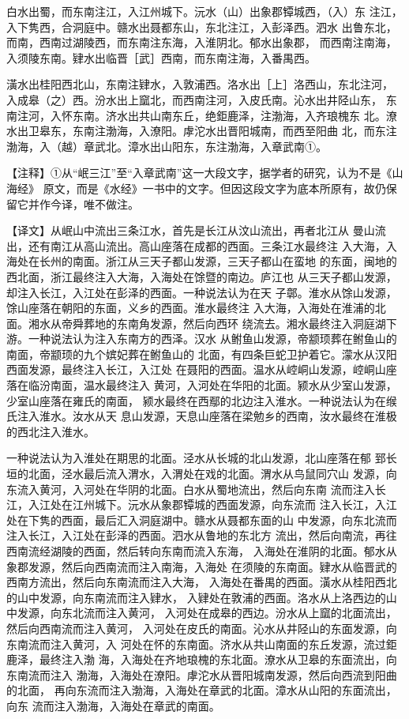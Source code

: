 \documentclass[a4paper,12pt,UTF8,twoside]{ctexbook}
\begin{document}
白水出蜀，而东南注江，入江州城下。沅水（山）出象郡镡城西，（入）东 注江，入下隽西，合洞庭中。赣水出聂都东山，东北注江，入彭泽西。泗水 出鲁东北，而南，西南过湖陵西，而东南注东海，入淮阴北。郁水出象郡， 而西南注南海，入须陵东南。肄水出临晋［武］西南，而东南注海，入番禺西。

潢水出桂阳西北山，东南注肄水，入敦浦西。洛水出［上］洛西山，东北注河， 入成皋（之）西。汾水出上窳北，而西南注河，入皮氏南。沁水出井陉山东， 东南注河，入怀东南。济水出共山南东丘，绝鉅鹿泽，注渤海，入齐琅槐东 北。潦水出卫皋东，东南注渤海，入潦阳。虖沱水出晋阳城南，而西至阳曲 北，而东注渤海，入（越）章武北。漳水出山阳东，东注渤海，入章武南①。

【注释】①从“岷三江”至“入章武南”这一大段文字，据学者的研究，认为不是《山海经》 原文，而是《水经》一书中的文字。但因这段文字为底本所原有，故仍保留它并作今译，唯不做注。

【译文】从岷山中流出三条江水，首先是长江从汶山流出，再者北江从 曼山流出，还有南江从高山流出。高山座落在成都的西面。三条江水最终注 入大海，入海处在长州的南面。浙江从三天子都山发源，三天子都山在蛮地 的东面，闽地的西北面，浙江最终注入大海，入海处在馀暨的南边。庐江也 从三天子都山发源，却注入长江，入江处在彭泽的西面。一种说法认为在天 子鄣。淮水从馀山发源，馀山座落在朝阳的东面，义乡的西面。淮水最终注 入大海，入海处在淮浦的北面。湘水从帝舜葬地的东南角发源，然后向西环 绕流去。湘水最终注入洞庭湖下游。一种说法认为注入东南方的西泽。汉水 从鲋鱼山发源，帝颛顼葬在鲋鱼山的南面，帝颛顼的九个嫔妃葬在鲋鱼山的 北面，有四条巨蛇卫护着它。濛水从汉阳西面发源，最终注入长江，入江处 在聂阳的西面。温水从崆峒山发源，崆峒山座落在临汾南面，温水最终注入 黄河，入河处在华阳的北面。颍水从少室山发源，少室山座落在雍氏的南面， 颍水最终在西鄢的北边注入淮水。一种说法认为在缑氏注入淮水。汝水从天 息山发源，天息山座落在梁勉乡的西南，汝水最终在淮极的西北注入淮水。

一种说法认为入淮处在期思的北面。泾水从长城的北山发源，北山座落在郁 郅长垣的北面，泾水最后流入渭水，入渭处在戏的北面。渭水从鸟鼠同穴山 发源，向东流入黄河，入河处在华阴的北面。白水从蜀地流出，然后向东南 流而注入长江，入江处在江州城下。沅水从象郡镡城的西面发源，向东流而 注入长江，入江处在下隽的西面，最后汇入洞庭湖中。赣水从聂都东面的山 中发源，向东北流而注入长江，入江处在彭泽的西面。泗水从鲁地的东北方 流出，然后向南流，再往西南流经湖陵的西面，然后转向东南而流入东海， 入海处在淮阴的北面。郁水从象郡发源，然后向西南流而注入南海，入海处 在须陵的东南面。肄水从临晋武的西南方流出，然后向东南流而注入大海， 入海处在番禺的西面。潢水从桂阳西北的山中发源，向东南流而注入肄水， 入肄处在敦浦的西面。洛水从上洛西边的山中发源，向东北流而注入黄河， 入河处在成皋的西边。汾水从上窳的北面流出，然后向西南流而注入黄河， 入河处在皮氏的南面。沁水从井陉山的东面发源，向东南流而注入黄河，入 河处在怀的东南面。济水从共山南面的东丘发源，流过鉅鹿泽，最终注入渤 海，入海处在齐地琅槐的东北面。潦水从卫皋的东面流出，向东南流而注入 渤海，入海处在潦阳。虖沱水从晋阳城南发源，然后向西流到阳曲的北面， 再向东流而注入渤海，入海处在章武的北面。漳水从山阳的东面流出，向东 流而注入渤海，入海处在章武的南面。
\end{document}
